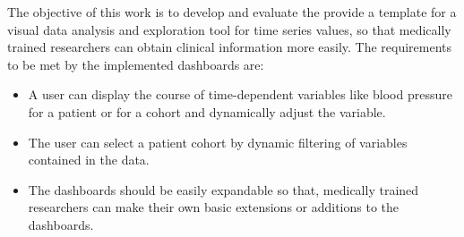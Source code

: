 The objective of this work is to develop and evaluate the provide a template for a visual data analysis
and exploration tool for time series values, so that medically trained researchers can obtain clinical
information more easily. The requirements to be met by the implemented dashboards are:
\begin{itemize}
\item A user can display the course of time-dependent variables like blood pressure for a patient or for a cohort and dynamically adjust the variable.
\item The user can select a patient cohort by dynamic filtering of variables contained in the data.
\item The dashboards should be easily expandable so that, medically trained researchers can make their own basic extensions or additions to the dashboards.
\end{itemize}